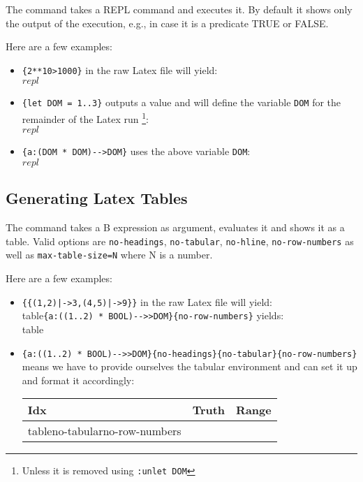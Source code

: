 \documentclass[final]{llncs}
\newcommand{\probrepl}[2][silent]{repl} %
\newcommand{\probtable}[3][no]{table} %
\begin{document}
The {\tt {}} command takes a REPL command and executes it.
By default it shows only the output of the execution, e.g., in case it is a predicate
TRUE or FALSE.

Here are a few examples:
\begin{itemize}
   \item  {}\verb+{2**10>1000}+ in the raw Latex file will yield:\\
        {$\probrepl{2**10>1000}$}
    \item   {}\verb+{let DOM = 1..3}+ outputs a value and will define the variable 
    {\tt DOM} for the remainder of the Latex run%
\footnote{Unless it is removed using {\tt :unlet DOM}}:\\
        {$\probrepl{let DOM = 1..3}$}
    \item    {}\verb+{a:(DOM * DOM)-->DOM}+  uses the above variable {\tt DOM}:\\
        $\probrepl{a:(DOM * DOM)-->DOM}$
\end{itemize}


\subsection{Generating Latex Tables}
The {\tt {}} command takes a B expression as argument, evaluates it and shows it as a table.
Valid options are {\tt no-headings}, {\tt no-tabular}, {\tt no-hline}, {\tt no-row-numbers}
 as well as {\tt max-table-size=N} where N is a number.

Here are a few examples:
\begin{itemize}
   \item  {}\verb+{{(1,2)|->3,(4,5)|->9}}+ in the raw Latex file will yield:\\
   
        \probtable{{(1,2)|->3,(4,5)|->9}}
        
   \item    {}\verb+{a:((1..2) * BOOL)-->>DOM}{no-row-numbers}+  yields:\\
   
        \probtable{a:((1..2) * BOOL)-->>DOM}{no-row-numbers}
        
   \item    {}\verb+{a:((1..2) * BOOL)-->>DOM}{no-headings}{no-tabular}{no-row-numbers}+  means we have
    to provide ourselves the tabular environment and can set it up and format it accordingly:\\
    
      \begin{tabular}{|l|r|r|}
       \hline
         Idx & Truth & Range\\
        \hline
        \probtable{a:((1..2) * BOOL)-->>DOM}{no-headings}{no-tabular}{no-row-numbers}
        \hline
       \end{tabular}
       
\end{itemize}
\end{document}
